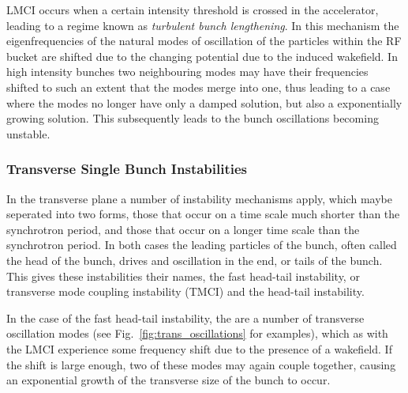 LMCI occurs when a certain intensity threshold is crossed in the accelerator, leading to a regime known as \emph{turbulent bunch lengthening}. In this mechanism the eigenfrequencies of the natural modes of oscillation of the particles within the RF bucket are shifted due to the changing potential due to the induced wakefield. In high intensity bunches two neighbouring modes may have their frequencies shifted to such an extent that the modes merge into one, thus leading to a case where the modes no longer have only a damped solution, but also a exponentially growing solution. This subsequently leads to the bunch oscillations becoming unstable.

\subsubsection{Transverse Single Bunch Instabilities}

In the transverse plane a number of instability mechanisms apply, which maybe seperated into two forms, those that occur on a time scale much shorter than the synchrotron period, and those that occur on a longer time scale than the synchrotron period. In both cases the leading particles of the bunch, often called the head of the bunch, drives and oscillation in the end, or tails of the bunch. This gives these instabilities their names, the fast head-tail instability, or transverse mode coupling instability (TMCI) and the head-tail instability.

In the case of the fast head-tail instability, the are a number of transverse oscillation modes (see Fig.~\ref{fig:trans_oscillations} for examples), which as with the LMCI experience some frequency shift due to the presence of a wakefield. If the shift is large enough, two of these modes may again couple together, causing an exponential growth of the transverse size of the bunch to occur.

